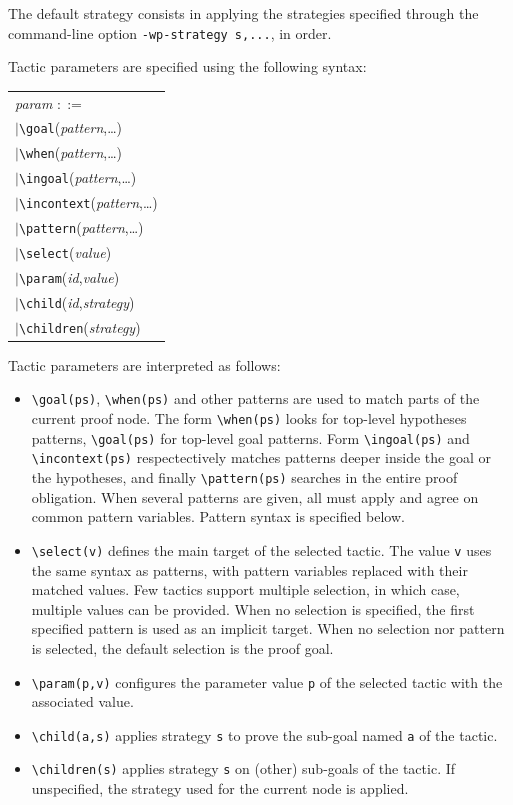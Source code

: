 The default strategy consists in applying the strategies specified through the
command-line option \verb+-wp-strategy s,...+, in order.

Tactic parameters are specified using the following syntax:

\begin{center}
  \begin{tabular}{l}
    \textit{param} $::=$ \\
    \quad$|$\quad\verb+\goal+(\textit{pattern},\ldots) \\
    \quad$|$\quad\verb+\when+(\textit{pattern},\ldots) \\
    \quad$|$\quad\verb+\ingoal+(\textit{pattern},\ldots) \\
    \quad$|$\quad\verb+\incontext+(\textit{pattern},\ldots) \\
    \quad$|$\quad\verb+\pattern+(\textit{pattern},\ldots) \\
    \quad$|$\quad\verb+\select+(\textit{value}) \\
    \quad$|$\quad\verb+\param+(\textit{id},\textit{value}) \\
    \quad$|$\quad\verb+\child+(\textit{id},\textit{strategy}) \\
    \quad$|$\quad\verb+\children+(\textit{strategy}) \\
  \end{tabular}
\end{center}

Tactic parameters are interpreted as follows:
\begin{itemize}
\item \verb+\goal(ps)+, \verb+\when(ps)+ and other patterns are used to
  match parts of the current proof node. The form \verb+\when(ps)+ looks
  for top-level hypotheses patterns, \verb+\goal(ps)+ for top-level goal patterns.
  Form \verb+\ingoal(ps)+ and \verb+\incontext(ps)+ respectectively matches patterns
  deeper inside the goal or the hypotheses, and finally
  \verb+\pattern(ps)+ searches in the entire proof obligation.
  When several patterns are given, all must apply and agree on common pattern variables.
  Pattern syntax is specified below.
\item \verb+\select(v)+ defines the main target of the selected tactic. The
  value \verb+v+ uses the same syntax as patterns, with pattern variables
  replaced with their matched values. Few tactics support multiple selection,
  in which case, multiple values can be provided.
  When no selection is specified, the first
  specified pattern is used as an implicit target. When no selection nor pattern
  is selected, the default selection is the proof goal.
\item \verb+\param(p,v)+ configures the parameter value \verb+p+ of the selected
  tactic with the associated value.
\item \verb+\child(a,s)+ applies strategy \verb+s+ to prove the sub-goal named
  \verb+a+ of the tactic.
\item \verb+\children(s)+ applies strategy \verb+s+ on (other) sub-goals of the
  tactic. If unspecified, the strategy used for the current node is applied.
\end{itemize}

